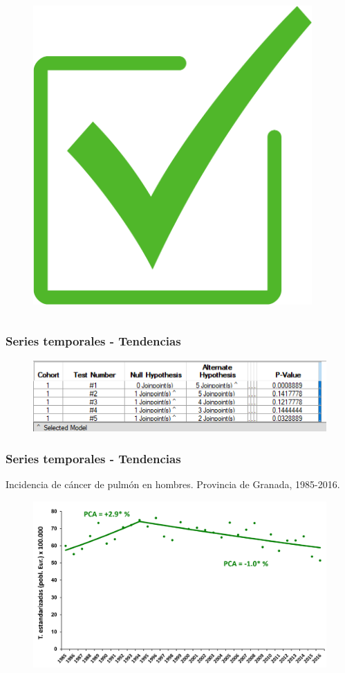\documentclass{beamer}
\begin{document}
\begin{frame}
	\pause
	\vspace{-110pt}
	\begin{columns}
		\begin{column}{.5\textwidth}
			\begin{figure}
				\centering
				\includegraphics[width=.4\textwidth]{images/check.png}
			\end{figure}
		\end{column}
		\begin{column}{.5\textwidth}
		\end{column}
	\end{columns}

\end{frame}


\begin{frame}\frametitle{Series temporales - Tendencias}
	\begin{figure}
		\centering
		\includegraphics[width=.8\textwidth]{images/jpo6.png}
	\end{figure}
\end{frame}


\begin{frame}\frametitle{Series temporales - Tendencias}
	\centering
	Incidencia de cáncer de pulmón en hombres. Provincia de Granada, 1985-2016.
	\begin{figure}
		\centering
		\includegraphics[width=\textwidth]{images/tendencias_pulmon1.png}
	\end{figure}
\end{frame}
\end{document}

